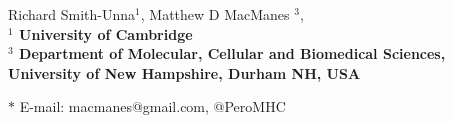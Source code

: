 \documentclass[11pt]{article}
\begin{document}
Richard Smith-Unna$^{1}$, 
Matthew D MacManes $^{3}$, 
\\


\bf{$^{1}$} University of Cambridge \\
\bf{$^{3}$} Department of Molecular, Cellular and Biomedical Sciences, University of New Hampshire, Durham NH, USA


$\ast$ E-mail: macmanes@gmail.com, @PeroMHC
\end{document}
